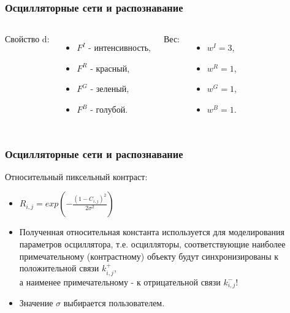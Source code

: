 \documentclass{beamer}
\begin{document}
\begin{frame}
\frametitle{Осцилляторные сети и распознавание}

\begin{columns}[t]
Свойство d:
\begin{itemize}
\item $F^I$ - интенсивность,
\item $F^R$ - красный,
\item $F^G$ - зеленый,
\item $F^B$ - голубой.
\end{itemize}

Вес:
\begin{itemize}
\item $w^I=3$,
\item $w^R=1$,
\item $w^G=1$,
\item $w^B=1$.
\end{itemize}
\end{columns}

\end{frame}


\begin{frame}
\frametitle{Осцилляторные сети и распознавание}

Относительный пиксельный контраст:
\medskip
\begin{itemize}
\item[]
\begin{center}
	$R_{i,j} = exp(- \frac{(1-C_{i,j})^2}{2\sigma^2})$
\end{center}
\bigskip
\item[] Полученная относительная константа используется для моделирования параметров осциллятора, т.е. осцилляторы, соответствующие наиболее примечательному (контрастному) объекту будут синхронизированы к положительной связи $k^{+}_{i,j}$,\\ а наименее примечательному - к отрицательной связи $k^{-}_{i,j}$!
\item[] Значение $\sigma$ выбирается пользователем.
\end{itemize}
\end{frame}

\end{document}
